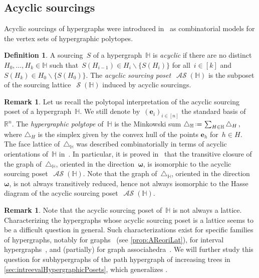 \documentclass{amsart}
\theoremstyle{definition}
\newtheorem{definition}[theorem]{Definition}
\newtheorem{remark}[theorem]{Remark}
\newcommand{\R}{\mathbb{R}} %
\renewcommand{\b}[1]{\boldsymbol{#1}} %
\newcommand{\ssm}{\smallsetminus} %
\newcommand{\eqdef}{\mbox{\,\raisebox{0.2ex}{\scriptsize\ensuremath{\mathrm:}}\ensuremath{=}\,}} %
\newcommand{\simplex}{\triangle} %
\newcommand{\darkblue}{\color{darkblue}} %
\newcommand{\defn}[1]{\textsl{\darkblue #1}} %
\DeclareMathOperator{\Sour}{\mathcal{S}}  %
\DeclareMathOperator{\ASour}{\mathcal{AS}}  %
\newcommand{\HH}{\mathbb H}  %
\begin{document}

\subsection{Acyclic sourcings}
\label{subsec:acyclicSourcings}

Acyclic sourcings of hypergraphs were introduced in~\cite{BenedettiBergeronMachacek,BergeronPilaud} as combinatorial models for the vertex sets of hypergraphic polytopes.

\begin{definition}
\label{def:ASour}
A sourcing~$S$ of a hypergraph~$\HH$ is \defn{acyclic} if there are no distinct~$H_0, \dots, H_k \in \HH$ such that~$S(H_{i-1}) \in H_i \ssm \{S(H_i)\}$ for all~$i \in [k]$ and~$S(H_k) \in H_0 \ssm \{S(H_0)\}$.
The \defn{acyclic sourcing poset}~$\ASour(\HH)$ is the subposet of the sourcing lattice~$\Sour(\HH)$ induced by acyclic sourcings.
\end{definition}

\begin{remark}
Let us recall the polytopal interpretation of the acyclic sourcing poset of a hypergraph~$\HH$.
We still denote by~$(\b{e}_i)_{i \in [n]}$ the standard basis of~$\R^n$.
The \defn{hypergraphic polytope} of~$\HH$ is the Minkowski sum
\(
\simplex_\HH \eqdef \sum_{H\in \HH} \simplex_H\,,
\)
where $\simplex_H$ is the simplex given by the convex hull of the points $\b{e}_h$ for~$h \in H$.
The face lattice of~$\simplex_\HH$ was described combinatorially in terms of acyclic orientations of~$\HH$ in~\cite{BenedettiBergeronMachacek}.
In particular, it is proved in~\cite{Gelinas} that the transitive closure of the graph of~$\simplex_\HH$, oriented in the direction~$\b{\omega}$, is isomorphic to the acyclic sourcing poset~$\ASour(\HH)$.
Note that the graph of~$\simplex_\HH$, oriented in the direction~$\b{\omega}$, is not always transitively reduced, hence not always isomorphic to the Hasse diagram of the acyclic sourcing poset~$\ASour(\HH)$.
\end{remark}

\begin{remark}
\label{rem:ASourLat}
Note that the acyclic sourcing poset of~$\HH$ is not always a lattice.
Characterizing the hypergraphs whose acyclic sourcing poset is a lattice seems to be a difficult question in general.
Such characterizations exist for specific families of hypergraphs, notably for graphs~\cite{Pilaud-acyclicReorientationLattices} (see \cref{prop:AReoriLat}), for interval hypergraphs~\cite{BergeronPilaud}, and (partially) for graph associahedra~\cite{BarnardMcConville}.
We will further study this question for subhypergraphs of the path hypergraph of increasing trees in \cref{sec:intreevalHypergraphicPosets}, which generalizes \cite{BergeronPilaud}.
\end{remark}
\end{document}

